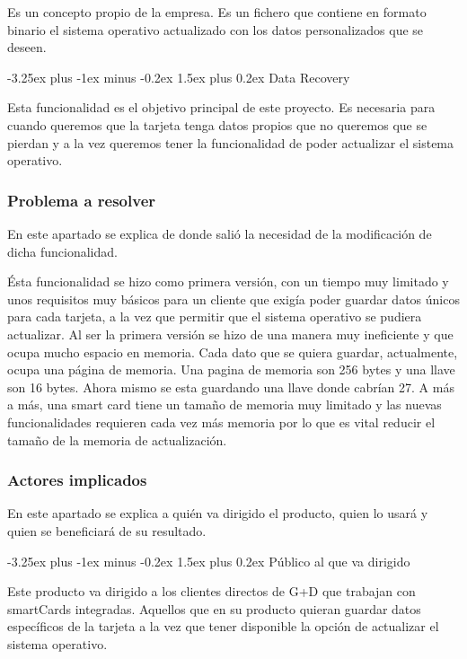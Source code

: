 \documentclass[12pt]{article}
\makeatletter
\renewcommand{\paragraph}{\@startsection{paragraph}{4}{0ex}%
   {-3.25ex plus -1ex minus -0.2ex}%
   {1.5ex plus 0.2ex}%
   {\normalfont\normalsize\bfseries}}
\makeatother
\begin{document}
    Es un concepto propio de la empresa. Es un fichero que contiene en formato binario el sistema operativo actualizado con los datos personalizados que se deseen.
    
    
    \paragraph{Data Recovery}

    Esta funcionalidad es el objetivo principal de este proyecto. Es necesaria para cuando queremos que la tarjeta tenga datos propios que no queremos que se pierdan y a la vez queremos tener la funcionalidad de poder actualizar el sistema operativo.

    \subsubsection{Problema a resolver}
    En este apartado se explica de donde salió la necesidad de la modificación de dicha funcionalidad.
    
    \vspace{4mm}
    
    Ésta funcionalidad se hizo como primera versión, con un tiempo muy limitado y unos requisitos muy básicos para un cliente que exigía poder guardar datos únicos para cada tarjeta, a la vez que permitir que el sistema operativo se pudiera actualizar. Al ser la primera versión se hizo de una manera muy ineficiente y que ocupa mucho espacio en memoria. Cada dato que se quiera guardar, actualmente, ocupa una página de memoria. Una pagina de memoria son 256 bytes y una llave son 16 bytes. Ahora mismo se esta guardando una llave donde cabrían 27. A más a más, una smart card tiene un tamaño de memoria muy limitado y las nuevas funcionalidades requieren cada vez más memoria por lo que es vital reducir el tamaño de la memoria de actualización.

    \subsubsection{Actores implicados}
    En este apartado se explica a quién va dirigido el producto, quien lo usará y quien se beneficiará de su resultado.
    
    \paragraph{Público al que va dirigido}
    
	Este producto va dirigido a los clientes directos de G+D que trabajan con smartCards integradas. Aquellos que en su producto quieran guardar datos específicos de la tarjeta a la vez que tener disponible la opción de actualizar el sistema operativo. 
    
\end{document}
